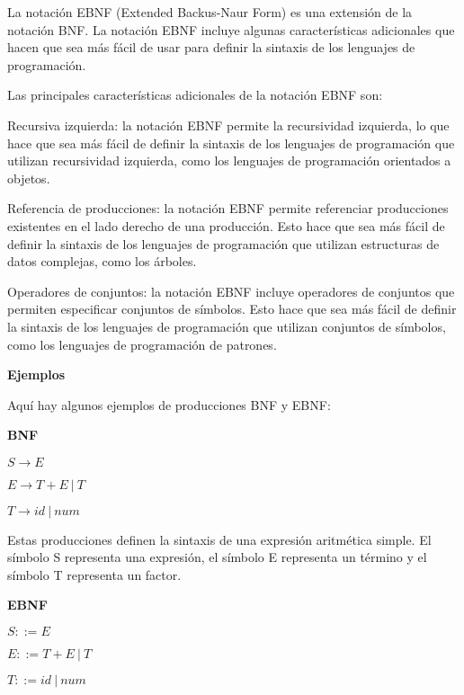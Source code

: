 \noindent La notación EBNF (Extended Backus-Naur Form) es una extensión de la notación BNF. La notación EBNF incluye algunas características adicionales que hacen que sea más fácil de usar para definir la sintaxis de los lenguajes de programación.

Las principales características adicionales de la notación EBNF son:

    Recursiva izquierda: la notación EBNF permite la recursividad izquierda, lo que hace que sea más fácil de definir la sintaxis de los lenguajes de programación que utilizan recursividad izquierda, como los lenguajes de programación orientados a objetos.
   
    Referencia de producciones: la notación EBNF permite referenciar producciones existentes en el lado derecho de una producción. Esto hace que sea más fácil de definir la sintaxis de los lenguajes de programación que utilizan estructuras de datos complejas, como los árboles.
    
    Operadores de conjuntos: la notación EBNF incluye operadores de conjuntos que permiten especificar conjuntos de símbolos. Esto hace que sea más fácil de definir la sintaxis de los lenguajes de programación que utilizan conjuntos de símbolos, como los lenguajes de programación de patrones.

\phantom{text}

\noindent \textbf{Ejemplos}

\phantom{text}
    

Aquí hay algunos ejemplos de producciones BNF y EBNF:

\phantom{text}

\noindent \textbf{BNF}

\phantom{text}

\begin{center}
    $S \xrightarrow{} E$
    
    $E \xrightarrow{} T + E\: |\: T$
    
    $T \xrightarrow{} id\: |\: num$
\end{center}

Estas producciones definen la sintaxis de una expresión aritmética simple. El símbolo S representa una expresión, el símbolo E representa un término y el símbolo T representa un factor.

\phantom{text}

\noindent \textbf{EBNF}

\phantom{text}

\begin{center}
    $S ::= E$
    
    $E ::= T + E\: |\: T$
    
    $T ::= id\: |\: num$
\end{center}

